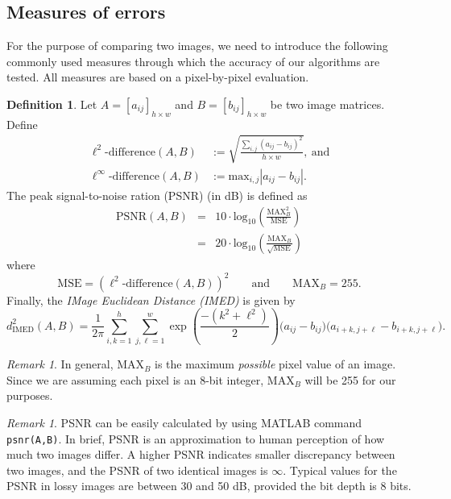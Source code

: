 \documentclass[12pt]{amsart}
\theoremstyle{definition}
\newtheorem{defn}[thm]{Definition}
\theoremstyle{remark}
\newtheorem{rem}[thm]{Remark}
\numberwithin{thm}{section}
\begin{document}
\subsection{Measures of errors}\label{subsect:measures}
For the purpose of comparing two images, we need to introduce the following commonly used measures through which the accuracy of our algorithms are tested. All measures are based on a pixel-by-pixel evaluation. 
\begin{defn}
Let $A=[a_{ij}]_{h\times w}$ and $B=[b_{ij}]_{h\times w}$ be two image matrices. %
Define
\begin{align*}
\ell^2\text{-difference}(A,B) &:= \sqrt{ \frac{ \sum_{i,j} \left( a_{ij} - b_{ij} \right)^2} {h \times w}},\ \textrm{and}\\
\ell^\infty\text{-difference}(A,B) &:= \textrm{max}_{i,j} \left \vert a_{ij} - b_{ij} \right\vert.
\end{align*}
The peak signal-to-noise ration (PSNR) \cite{HG08} (in dB) is defined as
\begin{displaymath}
\begin{array}{ccl}
\textrm{PSNR}(A,B) & = & 10\cdot \textrm{log}_{10} \left( \frac{\textrm{MAX}_B^2}{\textrm{MSE}} \right)\\
		 & = & 20 \cdot \textrm{log}_{10} \left( \frac{\textrm{MAX}_B}{\sqrt{\textrm{MSE}}} \right)
\end{array}
\end{displaymath}
where
\begin{displaymath}
\textrm{MSE} = (\ell^2\text{-difference}(A,B))^2 \qquad \textrm{and} \qquad \textrm{MAX}_B= 255.
\end{displaymath}
Finally, the \emph{IMage Euclidean Distance (IMED)}\cite{FWZ05} is given by
\[d_\text{IMED}^2(A,B) = \frac{1}{2\pi}\sum_{i,k = 1}^h\sum_{j,\ell = 1}^w \exp\left(\frac{-(k^2+\ell^2)}{2}\right)\big(a_{ij}-b_{ij}\big)\big(a_{i+k,j+\ell} - b_{i+k,j+\ell}\big).\]
\end{defn}

\begin{rem}
In general, $\text{MAX}_B$ is the maximum \emph{possible} pixel value of an image. Since we are assuming each pixel is an 8-bit integer, $\text{MAX}_B$ will be 255 for our purposes.
\end{rem}

\begin{rem}
PSNR can be easily calculated by using MATLAB command \texttt{psnr(A,B)}.
In brief, PSNR is an approximation to human perception of how much two images differ. A higher PSNR indicates smaller discrepancy between two images, and the PSNR of two identical images is $\infty$. Typical values for the PSNR in lossy images are between 30 and 50 dB, provided the bit depth is 8 bits. 
\end{rem}
\end{document}
